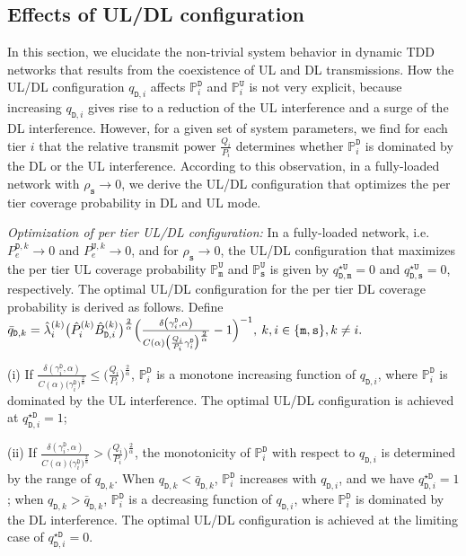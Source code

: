 \documentclass[twocolumn,english]{IEEEtran}
\theoremstyle{plain}
\theoremstyle{definition}
\begin{document}
\subsection{Effects of UL/DL configuration}

In this section, we elucidate the non-trivial system behavior in dynamic
TDD networks that results from the coexistence of UL and DL transmissions.
How the UL/DL configuration $q_{\mathtt{D},i}$ affects\emph{ }$\mathbb{P}_{i}^{\mathtt{D}}$
and $\mathbb{P}_{i}^{\mathtt{U}}$ is not very explicit, because increasing
$q_{\mathtt{D},i}$ gives rise to a reduction of the UL interference
and a surge of the DL interference. However, for a given set of system
parameters, we find for each tier $i$ that the relative transmit
power $\frac{Q_{i}}{P_{i}}$ determines whether $\mathbb{P}_{i}^{\mathtt{D}}$
is dominated by the DL or the UL interference. According to this observation,
in a fully-loaded network with $\rho_{\mathtt{s}}\rightarrow0$, we
derive the UL/DL configuration that optimizes the per tier coverage
probability in DL and UL mode.

\emph{Optimization of per tier UL/DL configuration:} In a fully-loaded
network, i.e. $P_{e}^{\mathtt{D},k}\rightarrow0$ and $P_{e}^{\mathtt{U},k}\rightarrow0$,
and for $\rho_{\mathtt{s}}\rightarrow0$, the UL/DL configuration
that maximizes the per tier UL coverage probability $\mathbb{P}_{\mathtt{m}}^{\mathtt{U}}$
and $\mathbb{P}_{\mathtt{s}}^{\mathtt{U}}$ is given by $q_{\mathtt{D,m}}^{\star\mathtt{U}}=0$
and $q_{\mathtt{D,s}}^{\star\mathtt{U}}=0$, respectively. The optimal
UL/DL configuration for the per tier DL coverage probability is derived
as follows. Define $\bar{q}_{\mathtt{D},k}=\hat{\lambda}_{i}^{(k)}\bigl(\hat{P}_{i}^{(k)}\hat{B}_{\mathtt{D},i}^{(k)}\bigr)^{\frac{2}{\alpha}}\Bigl(\frac{\delta\left(\gamma_{i}^{\mathtt{D}},\alpha\right)}{C(\alpha)\bigl(\frac{Q_{i}}{P_{i}}\gamma_{i}^{\mathtt{D}}\bigr)^{\frac{2}{\alpha}}}-1\Bigr)^{-1},\: k,i\in\{\mathtt{m},\mathtt{s}\},k\neq i.$

(i) If $\frac{\delta\left(\gamma_{i}^{\mathtt{D}},\alpha\right)}{C(\alpha)\bigl(\gamma_{i}^{\mathtt{D}}\bigr)^{\frac{2}{\alpha}}}\leq\bigl(\frac{Q_{i}}{P_{i}}\bigr)^{\frac{2}{\alpha}}$,
$\mathbb{P}_{i}^{\mathtt{D}}$ is a monotone increasing function of
$q_{\mathtt{D},i}$, where $\mathbb{P}_{i}^{\mathtt{D}}$ is dominated
by the UL interference. The optimal UL/DL configuration is achieved
at $q_{\mathtt{D,}i}^{\star\mathtt{D}}=1$;

(ii) If $\frac{\delta\left(\gamma_{i}^{\mathtt{D}},\alpha\right)}{C(\alpha)\bigl(\gamma_{i}^{\mathtt{D}}\bigr)^{\frac{2}{\alpha}}}>\bigl(\frac{Q_{i}}{P_{i}}\bigr)^{\frac{2}{\alpha}}$,
the monotonicity of $\mathbb{P}_{i}^{\mathtt{D}}$ with respect to
$q_{\mathtt{D},i}$ is determined by the range of $q_{\mathtt{D},k}$.
When $q_{\mathtt{D},k}<\bar{q}_{\mathtt{D},k}$, $\mathbb{P}_{i}^{\mathtt{D}}$
increases with $q_{\mathtt{D},i}$, and we have $q_{\mathtt{D,}i}^{\star\mathtt{D}}=1$;
when $q_{\mathtt{D},k}>\bar{q}_{\mathtt{D},k}$, $\mathbb{P}_{i}^{\mathtt{D}}$
is a decreasing function of $q_{\mathtt{D},i}$, where $\mathbb{P}_{i}^{\mathtt{D}}$
is dominated by the DL interference. The optimal UL/DL configuration
is achieved at the limiting case of $q_{\mathtt{D,}i}^{\star\mathtt{D}}=0$.
\end{document}
